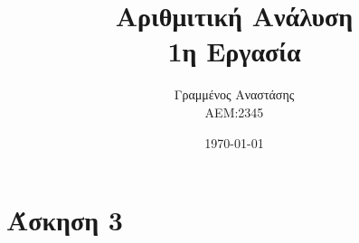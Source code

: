 \documentclass[12pt]{article}
\author{Γραμμένος Αναστάσης \\ ΑΕΜ:2345}
\date{\today}
\title{Αριθμιτική Ανάλυση \\ 1η Εργασία}
\begin{document}
\maketitle



\section{Άσκηση 3}



\end{document}
